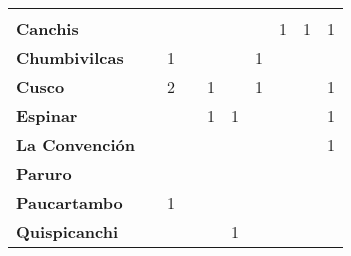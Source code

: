 \begin{tabular}{lccccccccc}
	&\cellcolor[HTML]{FCC46C}\\
	\textbf{Canchis}                            
	&\cellcolor[HTML]{FCC46C} 		  			&\cellcolor[HTML]{FCC46C} 
	&\cellcolor[HTML]{FCC46C}   				&\cellcolor[HTML]{FCC46C} 							&\cellcolor[HTML]{FCC46C}					&\cellcolor[HTML]{FCC46C} 		
	&1											&1
	&1\\
	\textbf{Chumbivilcas}                      
	&\cellcolor[HTML]{FCC46C}       			&1
	&\cellcolor[HTML]{FCC46C}   			    &\cellcolor[HTML]{FCC46C}
	&\cellcolor[HTML]{FCC46C}					&1			
	&\cellcolor[HTML]{FCC46C}					&\cellcolor[HTML]{FCC46C}
	&\cellcolor[HTML]{FCC46C}\\
	\textbf{Cusco}                             
	&\cellcolor[HTML]{FCC46C}    	 			&2 											&\cellcolor[HTML]{FCC46C} 		 			&1											
	&\cellcolor[HTML]{FCC46C}					&1											
	&\cellcolor[HTML]{FCC46C}					&\cellcolor[HTML]{FCC46C}
	&1\\
	\textbf{Espinar}       					                 						   
	&\cellcolor[HTML]{FCC46C} 
	&\cellcolor[HTML]{FCC46C} 					&\cellcolor[HTML]{FCC46C} 		 
	&1											&1									
	&\cellcolor[HTML]{FCC46C}				    &\cellcolor[HTML]{FCC46C}
	&\cellcolor[HTML]{FCC46C} 					&1\\
	\textbf{La Convención}                      
	&\cellcolor[HTML]{FCC46C}              		&\cellcolor[HTML]{FCC46C} 			
	&\cellcolor[HTML]{FCC46C}					&\cellcolor[HTML]{FCC46C}  					&\cellcolor[HTML]{FCC46C} 		            &\cellcolor[HTML]{FCC46C} 					
	&\cellcolor[HTML]{FCC46C} 					&\cellcolor[HTML]{FCC46C}
	&1\\
	\textbf{Paruro}                            
	&\cellcolor[HTML]{FCC46C}              	    &\cellcolor[HTML]{FCC46C}        			&\cellcolor[HTML]{FCC46C}                   &\cellcolor[HTML]{FCC46C}   				&\cellcolor[HTML]{FCC46C} 					&\cellcolor[HTML]{FCC46C}		 			&\cellcolor[HTML]{FCC46C}					&\cellcolor[HTML]{FCC46C}
	&\cellcolor[HTML]{FCC46C}\\
	\textbf{Paucartambo}               		    
	&\cellcolor[HTML]{FCC46C}                   
	&1											&\cellcolor[HTML]{FCC46C} 					&\cellcolor[HTML]{FCC46C}					&\cellcolor[HTML]{FCC46C}					
	&\cellcolor[HTML]{FCC46C}					&\cellcolor[HTML]{FCC46C}                   &\cellcolor[HTML]{FCC46C} 					&\cellcolor[HTML]{FCC46C}\\
	\textbf{Quispicanchi}                                         	                  
	&\cellcolor[HTML]{FCC46C} 	  				&\cellcolor[HTML]{FCC46C} 					&\cellcolor[HTML]{FCC46C} 					
	&\cellcolor[HTML]{FCC46C}					&1
	&\cellcolor[HTML]{FCC46C}					&\cellcolor[HTML]{FCC46C} 

\end{tabular}
